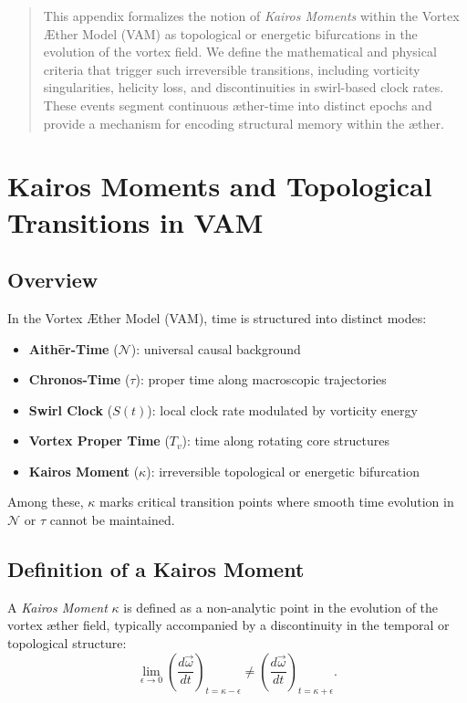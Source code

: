 \documentclass[12pt]{article}
\begin{document}
    \titlepageOpen

    \begin{abstract}
        This appendix formalizes the notion of \textit{Kairos Moments} within the Vortex \AE{}ther Model (VAM) as topological or energetic bifurcations in the evolution of the vortex field. We define the mathematical and physical criteria that trigger such irreversible transitions, including vorticity singularities, helicity loss, and discontinuities in swirl-based clock rates. These events segment continuous æther-time into distinct epochs and provide a mechanism for encoding structural memory within the æther.
    \end{abstract}



    \titlepageClose
    \fi

    \section{Kairos Moments and Topological Transitions in VAM}

    \subsection*{Overview}
    In the Vortex \AE{}ther Model (VAM), time is structured into distinct modes:
    \begin{itemize}
        \item \textbf{Aith\={e}r-Time} (\( \mathcal{N} \)): universal causal background
        \item \textbf{Chronos-Time} (\( \tau \)): proper time along macroscopic trajectories
        \item \textbf{Swirl Clock} (\( S(t) \)): local clock rate modulated by vorticity energy
        \item \textbf{Vortex Proper Time} (\( T_v \)): time along rotating core structures
        \item \textbf{Kairos Moment} (\( \kappa \)): irreversible topological or energetic bifurcation
    \end{itemize}
    Among these, \( \kappa \) marks critical transition points where smooth time evolution in \( \mathcal{N} \) or \( \tau \) cannot be maintained.

    \subsection{Definition of a Kairos Moment}
    A \textit{Kairos Moment} \( \kappa \) is defined as a non-analytic point in the evolution of the vortex æther field, typically accompanied by a discontinuity in the temporal or topological structure:
    \begin{equation}
        \lim_{\epsilon \to 0} \left( \frac{d\vec{\omega}}{dt} \right)_{t = \kappa - \epsilon}
        \neq
        \left( \frac{d\vec{\omega}}{dt} \right)_{t = \kappa + \epsilon}.
    \end{equation}
\end{document}
